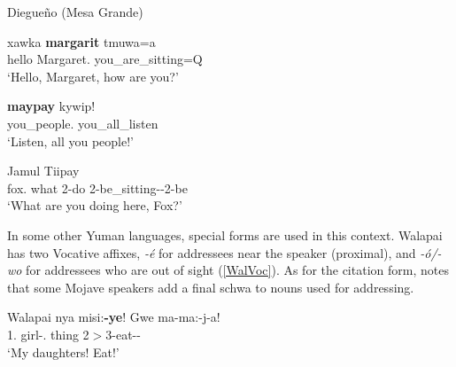 \begin{exe}\ex\label{DieVoc} {Diegue\~no (Mesa Grande)} \citep[158]{Langdon:1970}\nopagebreak[4]
\begin{xlist}
\ex\gll xawka \textbf{margarit} t\textschwa muwa=a\\
hello Margaret.\acc{} you\_are\_sitting=Q\\
`Hello, Margaret, how are you?'

\ex\gll \textbf{may\textglotstop pay} k\textschwa y\textschwa wip!\\
you\_people.\acc{} you\_all\_listen\\
`Listen, all you people!'
\end{xlist}
\end{exe}

\begin{exe}\ex\label{JamVoc} {Jamul Tiipay} \citep[128]{Miller:1990}\nopagebreak[4]
\gll\textbf{}    \\
fox.\acc{} what 2-do 2-be\_sitting-\ssbj{}-2-be\\
`What are you doing here, Fox?' 
\end{exe}

In some other Yuman languages, special forms are used in this context.
Walapai has two Vocative affixes, \emph{-\'e} for addressees near the speaker (proximal), and \emph{-\'o/-wo} for addressees who are out of sight (\ref{WalVoc}).
As for the citation form, \citet[129, footnote 3]{Munro:1976} notes that some Mojave speakers add a final schwa to nouns used for addressing.  %

\begin{exe}\ex\label{WalVoc} {Walapai} \citep[56]{Watahomigie:2001}\nopagebreak[4]
\gll nya misi:\textbf{-ye}! Gwe ma-ma:-j-a!\\
1\sg{}.\poss{} girl-\pl{}.\voc{} thing 2$>$3-eat-\pl{}-\imp{}\\
`My daughters! Eat!' %
\end{exe}

